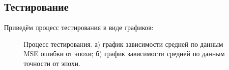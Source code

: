 \documentclass[a4paper,11pt]{article} %
\begin{document}
\subsection{Тестирование}
Приведём процесс тестирования в виде графиков:
 \begin{figure}[h]
\begin{minipage}[h]{0.49\linewidth}
\end{minipage}
\hfill
\begin{minipage}[h]{0.49\linewidth}
\end{minipage}
\caption{Процесс тестирования. а) график зависимости средней по данным MSE ошибки от эпохи; б) график зависимости средней по данным точности от эпохи.}
\label{test}
\end{figure}
\end{document}
